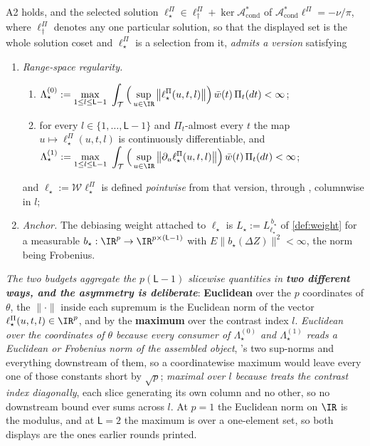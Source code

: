 \begin{assumption}\label{ass:sourcecondp}
A2 holds, and the selected solution
$\ell^\Pi_\star\in\ell^\Pi_\dagger+\ker\mathcal A^\ast_{\mathrm{cond}}$ of
$\mathcal A^\ast_{\mathrm{cond}}\ell^\Pi=-\nu/\pi$, where $\ell^\Pi_\dagger$ denotes any one
particular solution, so that the displayed set is the whole solution coset and $\ell^\Pi_\star$ is a
selection from it, \emph{admits a version} satisfying
\begin{enumerate}
\item[(i)] \emph{Range-space regularity.}
\begin{enumerate}
\item[(i.a)] $\Lambda^{(0)}_\star:=\displaystyle\max_{1\le l\le\mathsf L-1}\ \int_{\mathcal T}\Big(\sup_{u\in\IR}\big\|\ell^\Pi_\star(u,t,l)\big\|\Big)\,\bar w(t)\,\Pi_t(dt)<\infty$;
\item[(i.b)] for every $l\in\{1,\dots,\mathsf L-1\}$ and $\Pi_t$-almost every $t$ the map
$u\mapsto\ell^\Pi_\star(u,t,l)$ is continuously
differentiable, and
$\Lambda^{(1)}_\star:=\displaystyle\max_{1\le l\le\mathsf L-1}\ \int_{\mathcal T}\Big(\sup_{u\in\IR}\big\|\partial_u\ell^\Pi_\star(u,t,l)\big\|\Big)\,\bar w(t)\,\Pi_t(dt)<\infty$;
\end{enumerate}
and $\ell_\star:=\mathcal W\ell^\Pi_\star$ is defined \emph{pointwise} from that version, through
, columnwise in $l$;
\item[(iii)] \emph{Anchor.} The debiasing weight attached to $\ell_\star$ is
$L_\star:=L^{\,b_\star}_{\ell_\star}$ of \cref{def:weight} for a measurable
$b_\star:\IR^{p}\to\IR^{p\times(\mathsf L-1)}$ with $E\big\|b_\star(\Delta Z)\big\|^{2}<\infty$, the norm
being Frobenius.
\end{enumerate}
\emph{The two budgets aggregate the $p(\mathsf L-1)$ slicewise quantities in \textbf{two different ways,
and the asymmetry is deliberate}}: \textbf{Euclidean} over the $p$ coordinates of $\theta$, the
$\|\cdot\|$ inside each supremum is the Euclidean norm of the vector
$\ell^\Pi_\star(u,t,l)\in\IR^{p}$, and by
the \textbf{maximum} over the contrast index $l$. \emph{Euclidean over the coordinates of $\theta$
because every consumer of
$\Lambda^{(0)}_\star$ and $\Lambda^{(1)}_\star$ reads a Euclidean or Frobenius norm of the assembled
object}, 's two sup-norms and everything downstream of them, so a
coordinatewise maximum would leave every one of those constants short by
$\sqrt p$; \emph{maximal over $l$ because  treats the contrast index diagonally}, each
slice generating its own column and no other, so no downstream bound ever sums across $l$.
At $p=1$ the Euclidean norm on $\IR$ is the modulus, and at
$\mathsf L=2$ the maximum is over a one-element set, so both displays are the ones earlier rounds
printed.
\end{assumption}

